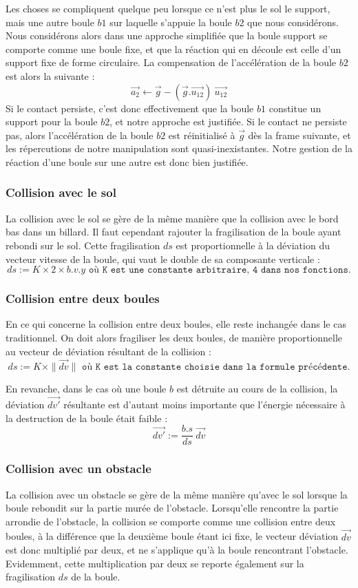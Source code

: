 \documentclass[a4paper,11pt]{article}
\begin{document}
Les choses se compliquent quelque peu lorsque ce n'est plus le sol le support, mais une autre boule $b1$ sur laquelle
s'appuie la boule $b2$ que nous considérons. Nous considérons alors dans une approche simplifiée que la boule support
se comporte comme une boule fixe, et que la réaction qui en découle est celle d'un support fixe de forme circulaire.
La compensation de l'accélération de la boule $b2$ est alors la suivante : 
\[ \vec{a_2} \leftarrow \vec{g} - (\vec{g} . \vec{u_{12}}) \ \vec{u_{12}} \]
Si le contact persiste, c'est donc effectivement que la boule $b1$ constitue un support pour la boule $b2$, et notre
approche est justifiée. Si le contact ne persiste pas, alors l'accélération de la boule $b2$ est réinitialisé à $\vec{g}$
dès la frame suivante, et les répercutions de notre manipulation sont quasi-inexistantes. Notre gestion de la réaction
d'une boule sur une autre est donc bien justifiée.

\subsubsection{Collision avec le sol}
La collision avec le sol se gère de la même manière que la collision avec le bord bas dans un billard. Il faut
cependant rajouter la fragilisation de la boule ayant rebondi sur le sol. Cette fragilisation $ds$ est proportionnelle
à la déviation du vecteur vitesse de la boule, qui vaut le double de sa composante verticale :
\[ ds := K \times 2 \times b.v.y \texttt{ où K est une constante arbitraire, 4 dans nos fonctions.}\]

\subsubsection{Collision entre deux boules}
En ce qui concerne la collision entre deux boules, elle reste inchangée dans le cas traditionnel. On doit alors
fragiliser les deux boules, de manière proportionnelle au vecteur de déviation résultant de la collision :
\[ ds := K \times \| \vec{dv} \| \texttt{ où K est la constante choisie dans la formule précédente.}\]

En revanche, dans le cas où une boule $b$ est détruite au cours de la collision, la déviation $\vec{dv'}$ résultante est d'autant
moins importante que l'énergie nécessaire à la destruction de la boule était faible :
\[ \vec{dv'} := \frac{b.s}{ds} \ \vec{dv} \]

\subsubsection{Collision avec un obstacle}
La collision avec un obstacle se gère de la même manière qu'avec le sol lorsque la boule rebondit sur la partie
murée de l'obstacle. Lorsqu'elle rencontre la partie arrondie de l'obstacle, la collision se comporte comme une
collision entre deux boules, à la différence que la deuxième boule étant ici fixe, le vecteur déviation $\vec{dv}$
est donc multiplié par deux, et ne s'applique qu'à la boule rencontrant l'obstacle. Evidemment, cette multiplication
par deux se reporte également sur la fragilisation $ds$ de la boule.
\end{document}
